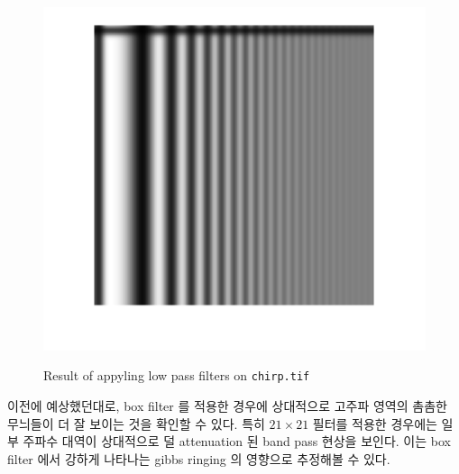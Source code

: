 \documentclass[a4paper, 12p]{paper}
\def\code#1{\texttt{#1}}
\begin{document}
\begin{figure}[H]
{\includegraphics[scale=0.40]{figs/impl2_gauss1_result.png}
}
\caption{Result of appyling low pass filters on \code{chirp.tif}}\label{fig:impl2_result}
\end{figure}

이전에 예상했던대로, box filter 를 적용한 경우에 상대적으로 고주파 영역의 촘촘한 무늬들이 더 잘 보이는 것을 확인할 수 있다. 특히 $21 \times 21 $ 필터를 적용한 경우에는 일부 주파수 대역이 상대적으로 덜 attenuation 된 band pass 현상을 보인다. 이는 box filter 에서 강하게 나타나는 gibbs ringing 의 영향으로 추정해볼 수 있다.
\end{document}
